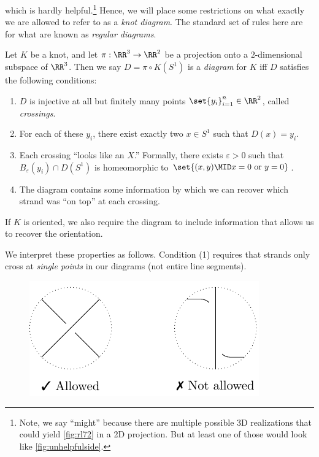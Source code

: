 \noindent which is hardly helpful.\footnote{Note, we say ``might''
  because there are multiple possible 3D realizations that could yield
  \cref{fig:rl72} in a 2D projection. But at least one of those would
  look like \cref{fig:unhelpfulside}.} Hence, we will place some
restrictions on what exactly we are allowed to refer to as a
\emph{knot diagram}. The standard set of rules here are for what are
known as \emph{regular diagrams}.
\begin{definition}
  Let $K$ be a knot, and let $\pi : \RR^3 \to \RR^2$ be a projection
  onto a $2$-dimensional subspace of $\RR^3$. Then we say $D = \pi
  \circ K(S^1)$ is a \emph{diagram} for $K$ iff $D$ satisfies the
  following conditions:
  \begin{enumerate}[label=\arabic*)]
    \item $D$ is injective at all but finitely many points
      $\set{y_i}_{i=1}^n \in \RR^2$, called \emph{crossings}.
    \item For each of these $y_i$, there exist exactly two $x \in S^1$
      such that $D(x) = y_i$.
    \item Each crossing ``looks like an $X$.'' Formally, there exists
      $\varepsilon > 0$ such that $B_\varepsilon(y_i) \cap D(S^1)$ is
      homeomorphic to $\set{(x,y) \MID x = 0 \text{ or } y = 0}$.
    \item The diagram contains some information by which we can
      recover which strand was ``on top'' at each crossing.
  \end{enumerate}
\end{definition}
\begin{note}
  If $K$ is oriented, we also require the diagram to include
  information that allows us to recover the orientation.
\end{note}
We interpret these properties as follows. Condition (1) requires
that strands only cross at \emph{single points} in our diagrams (not
entire line segments).
\begin{figure}[H]
  \centering
  \includegraphics{figures/background/point_cross.pdf}
\end{figure}
